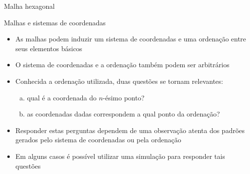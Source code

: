 \begin{frame}[fragile]{Malha hexagonal}
\begin{figure}[h]

    \end{figure}

\end{frame}

\begin{frame}[fragile]{Malhas e sistemas de coordenadas}

    \begin{itemize}
        \item As malhas podem induzir um sistema de coordenadas e uma ordenação entre seus elementos básicos

        \item O sistema de coordenadas e a ordenação também podem ser arbitrários

        \item Conhecida a ordenação utilizada, duas questões se tornam relevantes:

        \begin{enumerate}[(a)]
            \item qual é a coordenada do $n$-ésimo ponto?
            \item as coordenadas dadas correspondem a qual ponto da ordenação?
        \end{enumerate}

        \item Responder estas perguntas dependem de uma observação atenta dos padrões gerados pelo sistema de coordenadas ou pela ordenação

        \item Em alguns casos é possível utilizar uma simulação para responder tais questões
    \end{itemize}

\end{frame}

